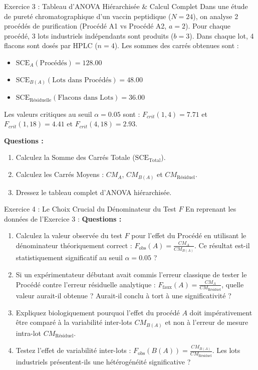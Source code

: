 \documentclass[11pt,a4paper]{article}
\begin{document}
\begin{exercicebox}{Exercice 3 : Tableau d'ANOVA Hiérarchisée \& Calcul Complet}
Dans une étude de pureté chromatographique d'un vaccin peptidique ($N = 24$), on analyse 2 procédés de purification (Procédé A1 vs Procédé A2, $a=2$). Pour chaque procédé, 3 lots industriels indépendants sont produits ($b=3$). Dans chaque lot, 4 flacons sont dosés par HPLC ($n=4$).
Les sommes des carrés obtenues sont :
\begin{itemize}
  \item $\text{SCE}_A (\text{Procédés}) = 128.00$
  \item $\text{SCE}_{B(A)} (\text{Lots dans Procédés}) = 48.00$
  \item $\text{SCE}_{\text{Résiduelle}} (\text{Flacons dans Lots}) = 36.00$
\end{itemize}
Les valeurs critiques au seuil $\alpha = 0.05$ sont : $F_{crit}(1, 4) = 7.71$ et $F_{crit}(1, 18) = 4.41$ et $F_{crit}(4, 18) = 2.93$.

\textbf{Questions :}
\begin{enumerate}[label=\textbf{\alph*.}]
  \item Calculez la Somme des Carrés Totale ($\text{SCE}_{\text{Total}}$).
  \item Calculez les Carrés Moyens : $CM_A$, $CM_{B(A)}$ et $CM_{\text{Résiduel}}$.
  \item Dressez le tableau complet d'ANOVA hiérarchisée.
\end{enumerate}
\end{exercicebox}

\begin{exercicebox}{Exercice 4 : Le Choix Crucial du Dénominateur du Test $F$}
En reprenant les données de l'Exercice 3 :
\textbf{Questions :}
\begin{enumerate}[label=\textbf{\alph*.}]
  \item Calculez la valeur observée du test $F$ pour l'effet du Procédé en utilisant le dénominateur théoriquement correct : $F_{\text{obs}}(A) = \frac{CM_A}{CM_{B(A)}}$. Ce résultat est-il statistiquement significatif au seuil $\alpha = 0.05$ ?
  \item Si un expérimentateur débutant avait commis l'erreur classique de tester le Procédé contre l'erreur résiduelle analytique : $F_{\text{faux}}(A) = \frac{CM_A}{CM_{\text{Résiduel}}}$, quelle valeur aurait-il obtenue ? Aurait-il conclu à tort à une significativité ?
  \item Expliquez biologiquement pourquoi l'effet du procédé $A$ doit impérativement être comparé à la variabilité inter-lots $CM_{B(A)}$ et non à l'erreur de mesure intra-lot $CM_{\text{Résiduel}}$.
  \item Testez l'effet de variabilité inter-lots : $F_{\text{obs}}(B(A)) = \frac{CM_{B(A)}}{CM_{\text{Résiduel}}}$. Les lots industriels présentent-ils une hétérogénéité significative ?
\end{enumerate}
\end{exercicebox}
\end{document}
